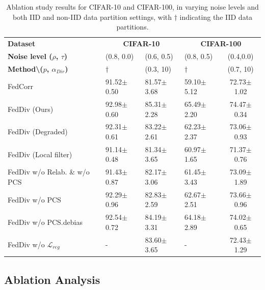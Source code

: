 \documentclass[letterpaper]{article} %
\begin{document}
\begin{table}[t]
    \centering
    \tiny
    \begin{tabular}{l|p{0.90cm}<{\centering}p{0.90cm}<{\centering}p{0.90cm}<{\centering}c}
    \toprule
    \midrule
    \textbf{Dataset} & \multicolumn{2}{c}{\textbf{CIFAR-10}} & \multicolumn{2}{c}{\textbf{CIFAR-100}} \\
    \textbf{Noise level ($\rho$, $\tau$)} & (0.8, 0.0) & (0.6, 0.5) & (0.8, 0.5) & (0.4,0.0) \\
    \textbf{Method\textbackslash ($p$, $\alpha_{Dir}$) }& $\dagger$ & (0.3, 10) & $\dagger$ & (0.7, 10) \\
    \midrule
    FedCorr~\cite{xu2022fedcorr}   & 91.52$\pm$0.50 & 81.57$\pm$3.68 &  59.10$\pm$5.12     & 72.73$\pm$1.02 \\
    FedDiv (Ours)                  & 92.98$\pm$0.60 & 85.31$\pm$2.28 &  65.49$\pm$2.20     & 74.47$\pm$0.34 \\
    \midrule
    FedDiv (Degraded)              & 92.31$\pm$0.61 & 83.22$\pm$2.61 &  62.23$\pm$2.37     & 73.06$\pm$0.93 \\
    FedDiv (Local filter)          & 91.14$\pm$0.48 & 81.34$\pm$3.65 &  60.97$\pm$1.65     & 71.37$\pm$0.76 \\
    \midrule
    FedDiv w/o Relab. \& w/o PCS   & 91.43$\pm$0.87 & 82.17$\pm$3.06 &  61.45$\pm$3.43     & 73.09$\pm$1.89 \\
    FedDiv w/o PCS                 & 92.29$\pm$0.96 & 82.83$\pm$2.59 &  62.67$\pm$2.51     & 73.66$\pm$0.96 \\
    FedDiv w/o PCS.debias          & 92.54$\pm$0.72 & 84.19$\pm$3.31 &  64.18$\pm$2.89     & 74.02$\pm$0.65 \\
    FedDiv w/o $\mathcal{L}_{reg}$ & -              & 83.60$\pm$3.65 &   -                 & 72.43$\pm$1.29 \\
    \bottomrule
    \end{tabular}%

    \caption{Ablation study results for CIFAR-10 and CIFAR-100, in varying noise levels and both IID and non-IID data partition settings, with $\dagger$ indicating the IID data partitions.}
    \label{Table:Ablation}%

\end{table}%

\subsection{Ablation Analysis}
\end{document}
